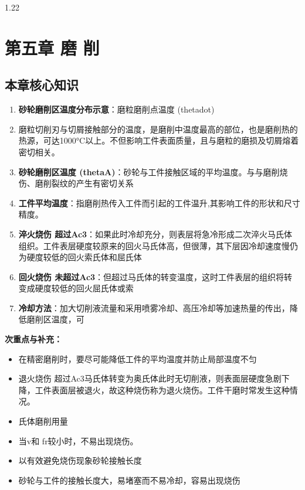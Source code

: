 \documentclass[12pt,a4paper]{article}
\begin{document}
\begin{spacing}{1.22}
\section{第五章 磨 削}
\subsection{本章核心知识}
\begin{tcolorbox}[colback=yellow!6,colframe=red!55!black,title=重点,left=1mm,right=1mm]
\begin{enumerate}[leftmargin=2.2em,label=\arabic*.]
  \item \textbf{砂轮磨削区温度分布示意}：磨粒磨削点温度 (thetadot)
  \item 磨粒切削刃与切屑接触部分的温度，是磨削中温度最高的部位，也是磨削热的热源，可达1000°C以上。不但影响工件表面质量，且与磨粒的磨损及切屑熔着密切相关。
  \item \textbf{砂轮磨削区温度 (thetaA)}：砂轮与工件接触区域的平均温度。与与磨削烧伤、磨削裂纹的产生有密切关系
  \item \textbf{工件平均温度}：指磨削热传入工件而引起的工件温升,其影响工件的形状和尺寸精度。
  \item \textbf{淬火烧伤 超过Ac3}：如果此时冷却充分，则表层将急冷形成二次淬火马氏体组织。工件表层硬度较原来的回火马氏体高，但很薄，其下层因冷却速度慢仍为硬度较低的回火索氏体和屈氏体
  \item \textbf{回火烧伤 未超过Ac3}：但超过马氏体的转变温度，这时工件表层的组织将转变成硬度较低的回火屈氏体或索
  \item \textbf{冷却方法}：加大切削液流量和采用喷雾冷却、高压冷却等加速热量的传出，降低磨削区温度，可
\end{enumerate}
\end{tcolorbox}
\noindent\textbf{次重点与补充：}
\begin{itemize}[leftmargin=2.2em,label=--]
  \item 在精密磨削时，要尽可能降低工件的平均温度并防止局部温度不匀
  \item 退火烧伤 超过Ac3马氏体转变为奥氏体此时无切削液，则表面层硬度急剧下降，工件表面层被退火，故这种烧伤称为退火烧伤。工件干磨时常发生这种情况。
  \item 氏体磨削用量
  \item 当v和 fr较小时，不易出现烧伤。
  \item 以有效避免烧伤现象砂轮接触长度
  \item 砂轮与工件的接触长度大，易堵塞而不易冷却，容易出现烧伤
\end{itemize}


\end{spacing}
\end{document}
